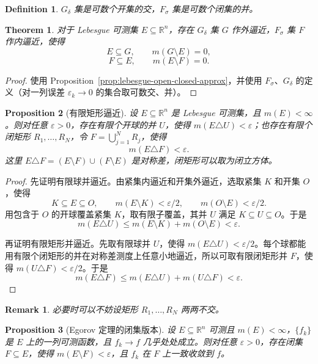 \documentclass[12pt,letterpaper,twoside,openright]{ctexbook}
\theoremstyle{bluehead}
\newtheorem{theorem}{Theorem}
\newtheorem{proposition}[theorem]{Proposition}
\theoremstyle{olivehead}
\newtheorem{definition}{Definition}
\theoremstyle{orangehead}
\theoremstyle{redremark}
\newtheorem*{remark}{Remark}
\begin{document}
\begin{definition}
$G_\delta$ 集是可数个开集的交，$F_\sigma$ 集是可数个闭集的并。
\end{definition}

\begin{theorem}\label{thm:lebesgue-gdelta-fsigma}
对于 Lebesgue 可测集 $E\subseteq\mathbb R^n$，存在 $G_\delta$ 集 $G$ 作外逼近，$F_\sigma$ 集 $F$ 作内逼近，使得
\[
E\subseteq G,\qquad m(G\setminus E)=0,
\]
\[
F\subseteq E,\qquad m(E\setminus F)=0.
\]
\end{theorem}

\begin{proof}
使用 Proposition~\ref{prop:lebesgue-open-closed-approx}，并使用 $F_\sigma$、$G_\delta$ 的定义（对一列误差 $\varepsilon_k\to0$ 的集合取可数交、并）。
\end{proof}
\begin{proposition}[有限矩形逼近]\label{prop:finite-rectangle-approx}\label{prop:closed-egorov}
设 $E\subseteq\mathbb R^n$ 是 Lebesgue 可测集，且 $m(E)<\infty$。则对任意 $\varepsilon>0$，存在有限个开球的并 $U$，使得 $m(E\triangle U)<\varepsilon$；也存在有限个闭矩形 $R_1,\ldots,R_N$，令 $F=\bigcup_{j=1}^N R_j$，使得
\[
m(E\triangle F)<\varepsilon.
\]
这里 $E\triangle F=(E\setminus F)\cup(F\setminus E)$ 是对称差，闭矩形可以取为闭立方体。
\end{proposition}

\begin{proof}
先证明有限球并逼近。由紧集内逼近和开集外逼近，选取紧集 $K$ 和开集 $O$，使得
\[
K\subseteq E\subseteq O,\qquad
m(E\setminus K)<\varepsilon/2,\qquad
m(O\setminus E)<\varepsilon/2.
\]
用包含于 $O$ 的开球覆盖紧集 $K$，取有限子覆盖，其并 $U$ 满足 $K\subseteq U\subseteq O$。于是
\[
m(E\triangle U)\leq m(E\setminus K)+m(O\setminus E)<\varepsilon.
\]

再证明有限矩形并逼近。先取有限球并 $U$，使得 $m(E\triangle U)<\varepsilon/2$。每个球都能用有限个闭矩形的并在对称差测度上任意小地逼近，所以可取有限闭矩形并 $F$，使得 $m(U\triangle F)<\varepsilon/2$。于是
\[
m(E\triangle F)\leq m(E\triangle U)+m(U\triangle F)<\varepsilon.
\]
\end{proof}
\begin{remark}
必要时可以不妨设矩形 $R_1,\ldots,R_N$ 两两不交。
\end{remark}
\begin{proposition}[Egorov 定理的闭集版本]
设 $E\subseteq\mathbb R^n$ 可测且 $m(E)<\infty$，$\{f_k\}$ 是 $E$ 上的一列可测函数，且 $f_k\to f$ 几乎处处成立。则对任意 $\varepsilon>0$，存在闭集 $F\subseteq E$，使得 $m(E\setminus F)<\varepsilon$，且 $f_k$ 在 $F$ 上一致收敛到 $f$。
\end{proposition}
\end{document}
